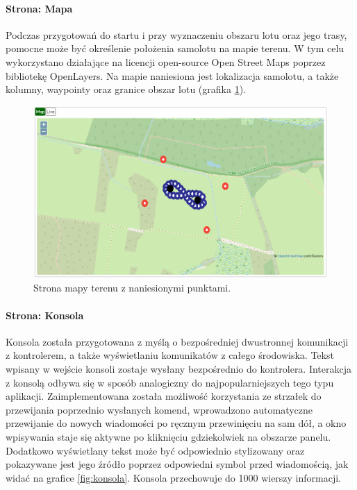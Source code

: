 \documentclass[12pt, a4paper]{article}
\begin{document}
\paragraph{Strona: Mapa}\mbox{}

Podczas przygotowań do startu i przy wyznaczeniu obszaru lotu oraz jego trasy, pomocne może być określenie położenia samolotu na mapie terenu. W tym celu wykorzystano działające na licencji open-source Open Street Maps poprzez bibliotekę OpenLayers. Na mapie naniesiona jest lokalizacja samolotu, a także kolumny, waypointy oraz granice obszar lotu (grafika \ref{fig:mapa}).

 \begin{figure}[H]
    \centering
    \includegraphics[width=1\textwidth]{mapa}
    \caption{Strona mapy terenu z naniesionymi punktami.}
    \label{fig:mapa}
\end{figure}


\paragraph{Strona: Konsola}\mbox{}

Konsola została przygotowana z myślą o bezpośredniej dwustronnej komunikacji z kontrolerem, a także wyświetlaniu komunikatów z całego środowiska. Tekst wpisany w wejście konsoli zostaje wysłany bezpośrednio do kontrolera. Interakcja z konsolą odbywa się w sposób analogiczny do najpopularniejszych tego typu aplikacji. Zaimplementowana została możliwość korzystania ze strzałek do przewijania poprzednio wysłanych komend, wprowadzono automatyczne przewijanie do nowych wiadomości po ręcznym przewinięciu na sam dół, a okno wpisywania staje się aktywne po kliknięciu gdziekolwiek na obszarze panelu. Dodatkowo wyświetlany tekst może być odpowiednio stylizowany oraz pokazywane jest jego źródło poprzez odpowiedni symbol przed wiadomością, jak widać na grafice \ref{fig:konsola}. Konsola przechowuje do 1000 wierszy informacji.
\end{document}
